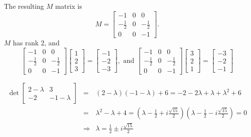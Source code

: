 The resulting $M$ matrix is
$$
M=\left[\begin{array}{ccc}-1&0&0\\-\frac{1}{2}&0&-\frac{1}{2}\\0&0&-1\end{array} \right].
$$
$M$ has rank 2, and
$$
\left[\begin{array}{ccc}-1&0&0\\-\frac{1}{2}&0&-\frac{1}{2}\\0&0&-1\end{array} \right]\left[\begin{array}{c}1\\2\\3\end{array}\right]=\left[\begin{array}{c}-1\\-2\\-3\end{array}\right],\textrm{ and }
\left[\begin{array}{ccc}-1&0&0\\-\frac{1}{2}&0&-\frac{1}{2}\\0&0&-1\end{array} \right]\left[\begin{array}{c}3\\2\\1\end{array}\right]=\left[\begin{array}{c}-3\\-2\\-1\end{array}\right]
$$


\vspace{2mm}
\begin{eqnarray*}
  \det\left[\begin{array}{cc}2-\lambda&3\\-2&-1-\lambda\end{array}\right]&=&(2-\lambda)(-1-\lambda)+6 = -2-2\lambda+\lambda+\lambda^2+6\\
	&=& \lambda^2-\lambda+4 = \left(\lambda-\frac{1}{2}+i\frac{\sqrt{15}}{2}\right)\left(\lambda-\frac{1}{2}-i\frac{\sqrt{15}}{2}\right)=0\\
	&\Rightarrow& \lambda = \frac{1}{2}\pm i\frac{\sqrt{15}}{2}
\end{eqnarray*}


